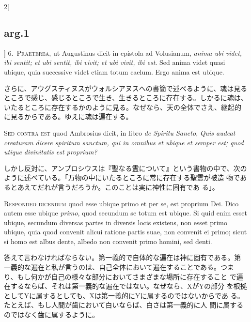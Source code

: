 \documentclass[paper=a4paper,fontsize=10pt,jafontsize=9pt,titlepage]{jlreq}
\begin{document}
\begin{paracol}{2}[\subsection{arg.1}]
6.~{\scshape Praeterea}, ut Augustinus dicit in epistola ad Volusianum,
 {\itshape anima ubi videt, ibi sentit; et ubi sentit, ibi vivit; et ubi
 vivit, ibi est}. Sed anima videt quasi ubique, quia successive videt
 etiam totum caelum. Ergo anima est ubique.

\switchcolumn

さらに、アウグスティヌスがウォルシアヌスへの書簡で述べるように、魂は見る
 ところで感じ、感じるところで生き、生きるところに存在する。しかるに魂は、
 いたるところに存在するかのように見る。なぜなら、天の全体でさえ、継起的
 に見るからである。ゆえに魂は遍在する。

\switchcolumn*[\subsection{s.c.}]

{\scshape Sed contra est} quod Ambrosius dicit, in libro {\itshape de
 Spiritu Sancto}, {\itshape Quis audeat creaturam dicere spiritum
 sanctum, qui in omnibus et ubique et semper est; quod utique
 divinitatis est proprium?}

\switchcolumn

しかし反対に、アンブロシウスは『聖なる霊について』という書物の中で、次の
 ように述べている。「万物の中にいたるところに常に存在する聖霊が被造
 物であるとあえてだれが言うだろうか。このことは実に神性に固有であ
 る」。


{\scshape Respondeo dicendum} quod esse ubique primo et per se, est proprium
 Dei. Dico autem esse ubique {\itshape primo}, quod secundum se totum est
 ubique. Si quid enim esset ubique, secundum diversas partes in diversis
 locis existens, non esset primo ubique, quia quod convenit alicui
 ratione partis suae, non convenit ei primo; sicut si homo est albus
 dente, albedo non convenit primo homini, sed denti.

\switchcolumn

答えて言わなければならない。第一義的で自体的な遍在は神に固有である。第
 一義的な遍在と私が言うのは、自己全体において遍在することである。つま
 り、もし何かが自己の様々な部分においてさまざまな場所に存在すること
 で遍在するならば、それは第一義的な遍在ではない。なぜなら、XがYの部分
 を根拠としてYに属するとしても、Xは第一義的にYに属するのではないからであ
 る。たとえば、もし人間が歯において白いならば、白さは第一義的に人
 間に属するのではなく歯に属するように。


\end{paracol}
\end{document}
